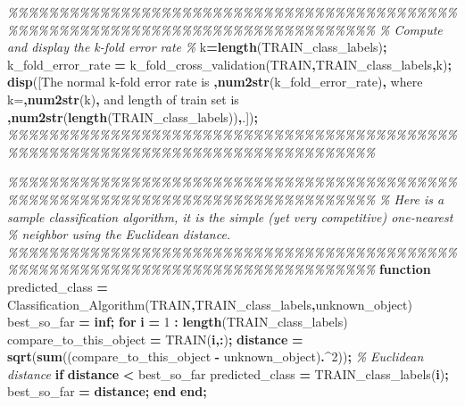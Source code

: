 \documentclass[
]{book}
\newenvironment{Shaded}{\begin{snugshade}}{\end{snugshade}}
\newcommand{\CommentTok}[1]{\textcolor[rgb]{0.56,0.35,0.01}{\textit{#1}}}
\newcommand{\ControlFlowTok}[1]{\textcolor[rgb]{0.13,0.29,0.53}{\textbf{#1}}}
\newcommand{\FloatTok}[1]{\textcolor[rgb]{0.00,0.00,0.81}{#1}}
\newcommand{\FunctionTok}[1]{\textcolor[rgb]{0.13,0.29,0.53}{\textbf{#1}}}
\newcommand{\NormalTok}[1]{#1}
\newcommand{\OperatorTok}[1]{\textcolor[rgb]{0.81,0.36,0.00}{\textbf{#1}}}
\newcommand{\StringTok}[1]{\textcolor[rgb]{0.31,0.60,0.02}{#1}}
\begin{document}
\begin{Shaded}
\begin{Highlighting}[]
\CommentTok{\%\%\%\%\%\%\%\%\%\%\%\%\%\%\%\%\%\%\%\%\%\%\%\%\%\%\%\%\%\%\%\%\%\%\%\%\%\%\%\%\%\%\%\%\%\%\%\%\%\%\%\%\%\%\%\%\%\%\%\%\%\%\%\%\%\%\%\%\%\%\%\%\%\%\%\%\%\%\%\%}
\CommentTok{\% Compute and display the k{-}fold error rate}
\CommentTok{\%}
\NormalTok{k}\OperatorTok{=}\FunctionTok{length}\NormalTok{(TRAIN\_class\_labels)}\OperatorTok{;}
\NormalTok{k\_fold\_error\_rate }\OperatorTok{=}\NormalTok{ k\_fold\_cross\_validation(TRAIN}\OperatorTok{,}\NormalTok{TRAIN\_class\_labels}\OperatorTok{,}\NormalTok{k)}\OperatorTok{;}
\FunctionTok{disp}\NormalTok{([}\StringTok{\textquotesingle{}The normal k{-}fold error rate is \textquotesingle{}}\OperatorTok{,}\FunctionTok{num2str}\NormalTok{(k\_fold\_error\_rate)}\OperatorTok{,}\StringTok{\textquotesingle{} where k=\textquotesingle{}}\OperatorTok{,}\FunctionTok{num2str}\NormalTok{(k)}\OperatorTok{,}\StringTok{\textquotesingle{} and length of train set is \textquotesingle{}}\OperatorTok{,}\FunctionTok{num2str}\NormalTok{(}\FunctionTok{length}\NormalTok{(TRAIN\_class\_labels))}\OperatorTok{,}\StringTok{\textquotesingle{}.\textquotesingle{}}\NormalTok{])}\OperatorTok{;}
\CommentTok{\%\%\%\%\%\%\%\%\%\%\%\%\%\%\%\%\%\%\%\%\%\%\%\%\%\%\%\%\%\%\%\%\%\%\%\%\%\%\%\%\%\%\%\%\%\%\%\%\%\%\%\%\%\%\%\%\%\%\%\%\%\%\%\%\%\%\%\%\%\%\%\%\%\%\%\%\%\%\%\%}

\CommentTok{\%\%\%\%\%\%\%\%\%\%\%\%\%\%\%\%\%\%\%\%\%\%\%\%\%\%\%\%\%\%\%\%\%\%\%\%\%\%\%\%\%\%\%\%\%\%\%\%\%\%\%\%\%\%\%\%\%\%\%\%\%\%\%\%\%\%\%\%\%\%\%\%\%\%\%\%\%\%\%\%}
\CommentTok{\% Here is a sample classification algorithm, it is the simple (yet very competitive) one{-}nearest}
\CommentTok{\% neighbor using the Euclidean distance. }
\CommentTok{\%\%\%\%\%\%\%\%\%\%\%\%\%\%\%\%\%\%\%\%\%\%\%\%\%\%\%\%\%\%\%\%\%\%\%\%\%\%\%\%\%\%\%\%\%\%\%\%\%\%\%\%\%\%\%\%\%\%\%\%\%\%\%\%\%\%\%\%\%\%\%\%\%\%\%\%\%\%\%\%}
\ControlFlowTok{function}\NormalTok{ predicted\_class }\OperatorTok{=}\NormalTok{ Classification\_Algorithm(TRAIN}\OperatorTok{,}\NormalTok{TRAIN\_class\_labels}\OperatorTok{,}\NormalTok{unknown\_object)}
\NormalTok{best\_so\_far }\OperatorTok{=} \FunctionTok{inf}\OperatorTok{;}
\ControlFlowTok{for} \FunctionTok{i} \OperatorTok{=} \FloatTok{1} \OperatorTok{:} \FunctionTok{length}\NormalTok{(TRAIN\_class\_labels)}
\NormalTok{    compare\_to\_this\_object }\OperatorTok{=}\NormalTok{ TRAIN(}\FunctionTok{i}\OperatorTok{,:}\NormalTok{)}\OperatorTok{;}
    \FunctionTok{distance} \OperatorTok{=} \FunctionTok{sqrt}\NormalTok{(}\FunctionTok{sum}\NormalTok{((compare\_to\_this\_object }\OperatorTok{{-}}\NormalTok{ unknown\_object)}\OperatorTok{.\^{}}\FloatTok{2}\NormalTok{))}\OperatorTok{;} \CommentTok{\% Euclidean distance}
    \ControlFlowTok{if} \FunctionTok{distance} \OperatorTok{\textless{}}\NormalTok{ best\_so\_far}
\NormalTok{        predicted\_class }\OperatorTok{=}\NormalTok{ TRAIN\_class\_labels(}\FunctionTok{i}\NormalTok{)}\OperatorTok{;}
\NormalTok{        best\_so\_far }\OperatorTok{=} \FunctionTok{distance}\OperatorTok{;}
    \ControlFlowTok{end}
 \ControlFlowTok{end}\OperatorTok{;}
\end{Highlighting}
\end{Shaded}
\end{document}
